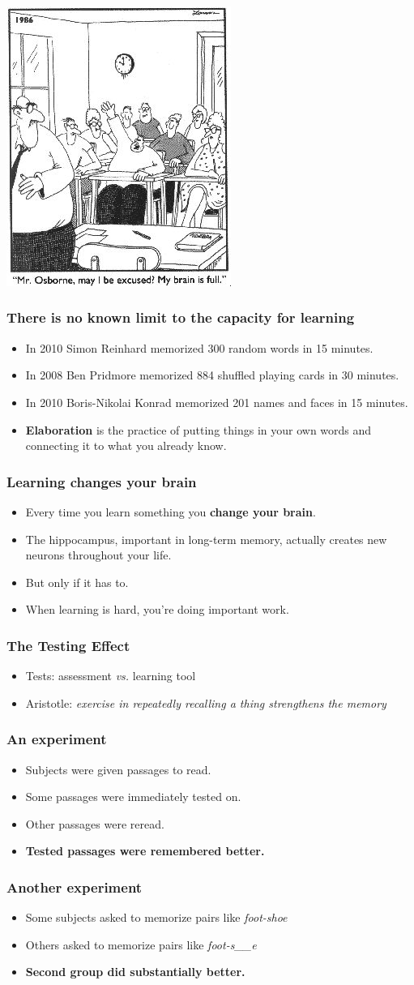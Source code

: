 \documentclass{beamer}
\newcommand{\bi}{\begin{itemize}}
\newcommand{\li}{\item}
\newcommand{\ei}{\end{itemize}}
\newcommand{\bfr}[1]{\begin{frame}[fragile]\frametitle{{ #1 }}}
\begin{document}
\bfr{}
\begin{center}
\includegraphics[height=0.9\textheight]{brainisfull.jpg}
\end{center}
\end{frame}

\bfr{There is no known limit to the capacity for learning}
\bi
\li In 2010 Simon Reinhard memorized 300 random words in 15 minutes.
\li In 2008 Ben Pridmore memorized 884 shuffled playing cards in 30 minutes. 
\li In 2010 Boris-Nikolai Konrad memorized 201 names and faces in 15 minutes.
\li {\bf Elaboration} is the practice of putting things in your own words
and connecting it to what you already know.
\ei
\end{frame}

\bfr{Learning changes your brain}
\bi
\li Every time you learn something you {\bf change your brain}.
\li The hippocampus, important in
long-term memory, actually creates new neurons throughout your life.
\li But only if it has to.
\li When learning is hard, you're doing important work.
\ei
\end{frame}

\bfr{The Testing Effect}
\bi
\li Tests: assessment {\em vs.} learning tool
\li Aristotle:  {\em exercise in repeatedly recalling a thing
strengthens the memory}
\ei
\end{frame}

\bfr{An experiment}
\bi
\li Subjects were given passages to read.
\li Some passages were immediately tested on.
\li Other passages were reread.
\li {\bf Tested passages were remembered better.}
\ei
\end{frame}

\bfr{Another experiment}
\bi
\li Some subjects asked to memorize pairs like {\em foot-shoe}
\li Others asked to memorize pairs like {\em foot-s\_\_e}
\li {\bf Second group did substantially better.}
\ei
\end{frame}
\bfr{}
\centerline{\huge{}}
\end{frame}
\end{document}
